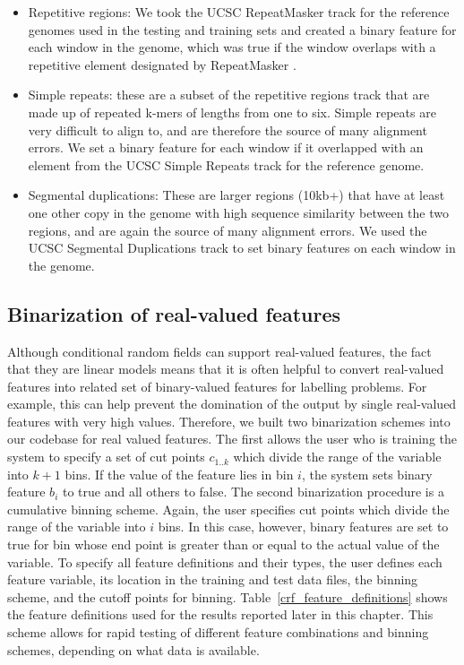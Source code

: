 \begin{itemize}
\item Repetitive regions: We took the UCSC RepeatMasker track for the reference genomes used in the testing and training sets and created a binary feature for each window in the genome, which was true if the window overlaps with a repetitive element designated by RepeatMasker \cite{repeatmasker}.

\item Simple repeats: these are a subset of the repetitive regions track that are made up of repeated k-mers of lengths from one to six. Simple repeats are very difficult to align to, and are therefore the source of many alignment errors. We set a binary feature for each window if it overlapped with an element from the UCSC Simple Repeats track \cite{Benson01011999} for the reference genome.

\item Segmental duplications: These are larger regions (10kb+) that have at least one other copy in the genome with high sequence similarity between the two regions, and are again the source of many alignment errors. We used the UCSC Segmental Duplications track to set binary features on each window in the genome.

\end{itemize}

\subsection{Binarization of real-valued features}

Although conditional random fields can support real-valued features, the fact that they are linear models means that it is often helpful to convert real-valued features into related set of binary-valued features for labelling problems. For example, this can help prevent the domination of the output by single real-valued features with very high values. Therefore, we built two binarization schemes into our codebase for real valued features. The first allows the user who is training the system to specify a set of cut points $c_{1..k}$ which divide the range of the variable into $k + 1$ bins. If the value of the feature lies in bin $i$, the system sets binary feature $b_i$ to true and all others to false. The second binarization procedure is a cumulative binning scheme. Again, the user specifies cut points which divide the range of the variable into $i$ bins. In this case, however, binary features are set to true for bin whose end point is greater than or equal to the actual value of the variable. To specify all feature definitions and their types, the user defines each feature variable, its location in the training and test data files, the binning scheme, and the cutoff points for binning. Table~\ref{crf_feature_definitions} shows the feature definitions used for the results reported later in this chapter. This scheme allows for rapid testing of different feature combinations and binning schemes, depending on what data is available.

